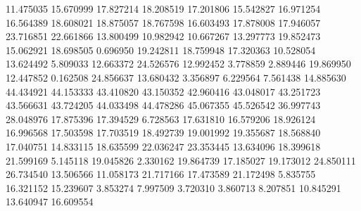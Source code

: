 11.475035
15.670999
17.827214
18.208519
17.201806
15.542827
16.971254
16.564389
18.608021
18.875057
18.767598
16.603493
17.878008
17.946057
23.716851
22.661866
13.800499
10.982942
10.667267
13.297773
19.852473
15.062921
18.698505
0.696950
19.242811
18.759948
17.320363
10.528054
13.624492
5.809033
12.663372
24.526576
12.992452
3.778859
2.889446
19.869950
12.447852
0.162508
24.856637
13.680432
3.356897
6.229564
7.561438
14.885630
44.434921
44.153333
43.410820
43.150352
42.960416
43.048017
43.251723
43.566631
43.724205
44.033498
44.478286
45.067355
45.526542
36.997743
28.048976
17.875396
17.394529
6.728563
17.631810
16.579206
18.926124
16.996568
17.503598
17.703519
18.492739
19.001992
19.355687
18.568840
17.040751
14.833115
18.635599
22.036247
23.353445
13.634096
18.399618
21.599169
5.145118
19.045826
2.330162
19.864739
17.185027
19.173012
24.850111
26.734540
13.506566
11.058173
21.717166
17.473589
21.172498
5.835755
16.321152
15.239607
3.853274
7.997509
3.720310
3.860713
8.207851
10.845291
13.640947
16.609554
